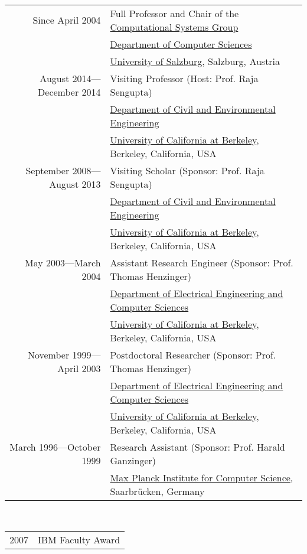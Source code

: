  \\
\begin{tabular}{rl}
Since April 2004 & Full Professor and Chair of the \href{http://www.cs.uni-salzburg.at/~ck/group}{Computational Systems Group} \\ %
                 & \href{http://www.cs.uni-salzburg.at}{Department of Computer Sciences} \\
                 & \href{http://www.sbg.ac.at}{University of Salzburg}, Salzburg, Austria \\
\noalign{\smallskip}
August 2014---December 2014 & Visiting Professor (Host: Prof. Raja Sengupta)\\
                     & \href{http://www.ce.berkeley.edu}{Department of Civil and Environmental Engineering} \\
                     & \href{http://www.berkeley.edu}{University of California at Berkeley}, Berkeley, California, USA \\
\noalign{\smallskip}
September 2008---August 2013 & Visiting Scholar (Sponsor: Prof. Raja Sengupta)\\
                     & \href{http://www.ce.berkeley.edu}{Department of Civil and Environmental Engineering} \\
                     & \href{http://www.berkeley.edu}{University of California at Berkeley}, Berkeley, California, USA \\
\noalign{\smallskip}
May 2003---March 2004 & Assistant Research Engineer (Sponsor: Prof. Thomas Henzinger)\\
                 & \href{http://www.eecs.berkeley.edu}{Department of Electrical Engineering and Computer Sciences} \\
                 & \href{http://www.berkeley.edu}{University of California at Berkeley}, Berkeley, California, USA \\
\noalign{\smallskip}
November 1999---April 2003 & Postdoctoral Researcher (Sponsor: Prof. Thomas Henzinger)\\
                 & \href{http://www.eecs.berkeley.edu}{Department of Electrical Engineering and Computer Sciences} \\
                 & \href{http://www.berkeley.edu}{University of California at Berkeley}, Berkeley, California, USA \\
\noalign{\smallskip}
March 1996---October 1999 & Research Assistant (Sponsor: Prof. Harald Ganzinger)\\
                 & \href{http://www.mpi-sb.mpg.de}{Max Planck Institute for Computer Science}, Saarbr{\"u}cken, Germany \\
\end{tabular}

 \\
\begin{tabular}{rl}
2007 & IBM Faculty Award
\end{tabular}

\newpage
